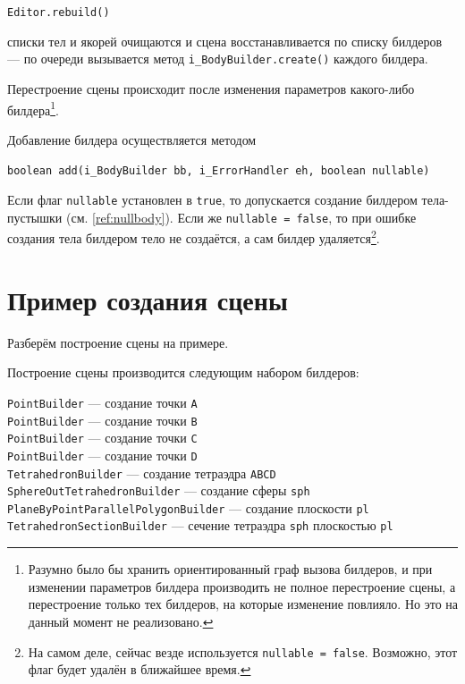 \documentclass[fontsize=10px, a4paper, openany]{scrbook}
\newcommand{\codeline}[1]{\vspace{5px}\colorbox{light-gray}{\texttt{#1}}\vspace{5px}}
\begin{document}
\codeline{Editor.rebuild()}

списки тел и якорей очищаются и сцена восстанавливается по списку билдеров --- по очереди вызывается метод \texttt{i\_BodyBuilder.create()} каждого билдера.

Перестроение сцены происходит после изменения параметров какого-либо билдера\footnote{Разумно было бы хранить ориентированный граф вызова билдеров, и при изменении параметров билдера производить не полное перестроение сцены, а перестроение только тех билдеров, на которые изменение повлияло. Но это на данный момент не реализовано.}.

Добавление билдера осуществляется методом

\codeline{boolean add(i\_BodyBuilder bb, i\_ErrorHandler eh, boolean nullable)}

Если флаг \texttt{nullable} установлен в \texttt{true}, то допускается создание билдером тела-пустышки (см. \ref{ref:nullbody}). Если же \texttt{nullable = false}, то при ошибке создания тела билдером тело не создаётся, а сам билдер удаляется\footnote{На самом деле, сейчас везде используется \texttt{nullable = false}. Возможно, этот флаг будет удалён в ближайшее время.}.

\section{Пример создания сцены}

Разберём построение сцены на примере.

\begin{quote}
\end{quote}

Построение сцены производится следующим набором билдеров:

\texttt{PointBuilder} --- создание точки \texttt{A}\\
\texttt{PointBuilder} --- создание точки \texttt{B}\\
\texttt{PointBuilder} --- создание точки \texttt{C}\\
\texttt{PointBuilder} --- создание точки \texttt{D}\\
\texttt{TetrahedronBuilder} --- создание тетраэдра \texttt{ABCD}\\
\texttt{SphereOutTetrahedronBuilder} --- создание сферы \texttt{sph}\\
\texttt{PlaneByPointParallelPolygonBuilder} --- создание плоскости \texttt{pl}\\
\texttt{TetrahedronSectionBuilder} --- сечение тетраэдра \texttt{sph} плоскостью \texttt{pl}
\end{document}
